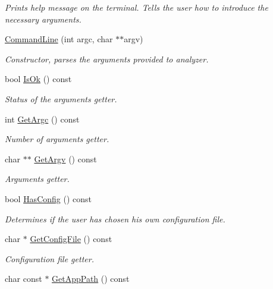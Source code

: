 \begin{DoxyCompactItemize}
\begin{DoxyCompactList}\small\item\em Prints help message on the terminal. Tells the user how to introduce the necessary arguments. \end{DoxyCompactList}\item 
\hyperlink{class_command_line_a60e98cded6040cc7ba4ad64361809ddd}{Command\-Line} (int argc, char $\ast$$\ast$argv)
\begin{DoxyCompactList}\small\item\em Constructor, parses the arguments provided to analyzer. \end{DoxyCompactList}\item 
bool \hyperlink{class_command_line_a6651a1fa1136fef801c262e9801ea419}{Is\-Ok} () const 
\begin{DoxyCompactList}\small\item\em Status of the arguments getter. \end{DoxyCompactList}\item 
int \hyperlink{class_command_line_a5f3c2a10763e81dc91dfa2b8affbb1c7}{Get\-Argc} () const 
\begin{DoxyCompactList}\small\item\em Number of arguments getter. \end{DoxyCompactList}\item 
char $\ast$$\ast$ \hyperlink{class_command_line_a5e82914e4fc19968843cbaec712f627c}{Get\-Argv} () const 
\begin{DoxyCompactList}\small\item\em Arguments getter. \end{DoxyCompactList}\item 
bool \hyperlink{class_command_line_a1ef3920d53a63e97dbc3c823b1bf5060}{Has\-Config} () const 
\begin{DoxyCompactList}\small\item\em Determines if the user has chosen his own configuration file. \end{DoxyCompactList}\item 
char $\ast$ \hyperlink{class_command_line_a3f0aaa56fbbb79af92d4d91d853ea23c}{Get\-Config\-File} () const 
\begin{DoxyCompactList}\small\item\em Configuration file getter. \end{DoxyCompactList}\item 
char const $\ast$ \hyperlink{class_command_line_a75d2c3e1757396de574c1375526a3f3f}{Get\-App\-Path} () const 

\end{DoxyCompactItemize}
